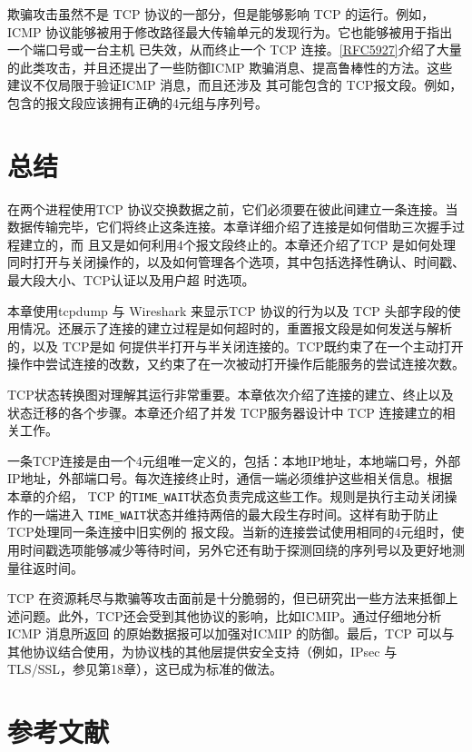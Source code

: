 欺骗攻击虽然不是 TCP 协议的一部分，但是能够影响 TCP 的运行。例如，ICMP
协议能够被用于修改路径最大传输单元的发现行为。它也能够被用于指出一个端口号或一台主机
已失效，从而终止一个 TCP
连接。\href{https://www.rfc-editor.org/rfc/rfc5927}{[RFC5927]}介绍了大量的此类攻击，并且还提出了一些防御ICMP
欺骗消息、提高鲁棒性的方法。这些建议不仅局限于验证ICMP 消息，而且还涉及
其可能包含的 TCP报文段。例如，包含的报文段应该拥有正确的4元组与序列号。
\section{总结}
在两个进程使用TCP 协议交换数据之前，它们必须要在彼此间建立一条连接。当数据传输完毕，它们将终止这条连接。本章详细介绍了连接是如何借助三次握手过程建立的，而
且又是如何利用4个报文段终止的。本章还介绍了TCP
是如何处理同时打开与关闭操作的，以及如何管理各个选项，其中包括选择性确认、时间戳、最大段大小、TCP认证以及用户超
时选项。

本章使用tcpdump 与 Wireshark 来显示TCP 协议的行为以及 TCP
头部字段的使用情况。还展示了连接的建立过程是如何超时的，重置报文段是如何发送与解析的，以及 TCP是如
何提供半打开与半关闭连接的。TCP既约束了在一个主动打开操作中尝试连接的改数，又约束了在一次被动打开操作后能服务的尝试连接次数。

TCP状态转换图对理解其运行非常重要。本章依次介绍了连接的建立、终止以及状态迁移的各个步骤。本章还介绍了并发 TCP服务器设计中 TCP 连接建立的相关工作。

一条TCP连接是由一个4元组唯一定义的，包括：本地IP地址，本地端口号，外部IP地址，外部端口号。每次连接终止时，通信一端必须维护这些相关信息。根据本章的介绍，
TCP 的\verb|TIME_WAIT|状态负责完成这些工作。规则是执行主动关闭操作的一端进入
\verb|TIME_WAIT|状态并维持两倍的最大段生存时间。这样有助于防止 TCP处理同一条连接中旧实例的
报文段。当新的连接尝试使用相同的4元组时，使用时间戳选项能够减少等待时间，另外它还有助于探测回绕的序列号以及更好地测量往返时间。

TCP
在资源耗尽与欺骗等攻击面前是十分脆弱的，但已研究出一些方法来抵御上述问题。此外，TCP还会受到其他协议的影响，比如ICMIP。通过仔细地分析ICMP 消息所返回
的原始数据报可以加强对ICMIP 的防御。最后，TCP 可以与其他协议结合使用，为协议栈的其他层提供安全支持（例如，IPsec 与
TLS/SSL，参见第18章），这已成为标准的做法。
\section{参考文献}
